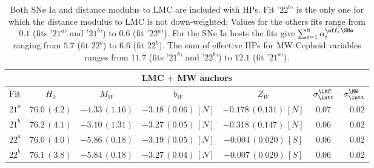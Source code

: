 \begin{table}[tbp]
\centering
\begin{tabular}{@{}lcccccr}
\hline
\multicolumn{7}{c}{LMC $+$ MW anchors} \\
\hline
Fit & $H_0$ & $M_W$ & $b_W$ & $Z_W$ &$\sigma_{\intt}^{\LMC}$ & $\sigma_{\intt}^{\MW}$ \\
\hline 
$21^a$ & $76.0\,(4.2)$ &$-4.33\,(1.16)$ &$-3.18\,(0.06)\,[N]$ &$-0.178\,(0.131)\,[N]$ & $0.07$& $0.02$\\

$21^b$ & $76.2\,(4.1)$ &$-3.10\,(1.31)$ &$-3.27\,(0.05)\,[N]$ &$-0.318\,(0.147)\,[N]$ & $0.06$& $0.02$\\
 
$22^a$ &$76.0\,(4.0)$ &$-5.86\,(0.18)$ &$-3.19\,(0.05)\,[N]$ &$-0.004\,(0.020)\,[S]$ & $0.06$ & $0.02$\\

$22^b$ &$76.1\,(3.8)$ &$-5.84\,(0.18)$ &$-3.27\,(0.04)\,[N]$ &$-0.007\,(0.020)\,[S]$ &$0.06$ & $0.02$\\
\hline 
\end{tabular}
\caption{Both SNe Ia and distance modulus to LMC are included with HPs. Fit '$22^b$' is the only one for which the distance modulus to LMC is not down-weighted; Values for the others fits range from $0.1$ (fits '$21^a$' and '$21^b$') to $0.6$ (fit '$22^a$'). For the SNe Ia hosts the fits give $\sum_{i=1}^{8} \alpha^{\eff,\,\SNe}_{i}$ ranging from $5.7$ (fit $22^b$) to $6.6$ (fit $22^b$). The sum of effective HPs for MW Cepheid variables ranges from $11.7$ (fits '$21^b$' and '$22^b$') to $12.1$ (fit '$21^a$').\label{Table:Joint-Constraints-LMC-MW}}
\end{table}




